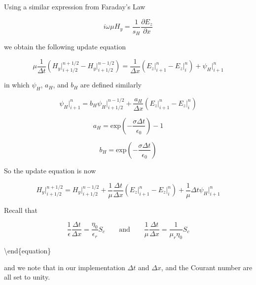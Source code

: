 \documentclass{article}
\begin{document}
    Using a similar expression from Faraday's Law

\begin{equation}
i \omega \mu H_y = \dfrac{1}{s_H} \dfrac{\partial E_z}{\partial x}
\end{equation}

we obtain the following update equation

\begin{equation}
\mu \dfrac{1}{\Delta t} \left ( H_y \Big |^{n+1/2}_{i+1/2} - H_y \Big |^{n-1/2}_{i+1/2} \right ) = \dfrac{1}{\Delta x} \left ( E_z \Big |^{n}_{i+1} - E_z \Big |^{n}_{i} \right ) + \psi_H \Big |^{n}_{i+1}
\end{equation}

in which \(\psi_H\), \(a_H\), and \(b_H\) are defined similarly

\begin{equation}
\psi_H \Big |^{n}_{i+1} = b_H \psi_H \Big |^{n-1/2}_{i+1/2} + \dfrac{a_H}{\Delta x} \left ( E_z \Big |^{n}_{i+1} - E_z \Big |^{n}_{i} \right )
\end{equation}

\begin{equation}
a_H = \mathrm{exp}\left ( - \dfrac{\sigma \Delta t}{\epsilon_0} \right ) -1 
\end{equation}

\begin{equation}
b_H = \mathrm{exp}\left ( - \dfrac{\sigma \Delta t}{\epsilon_0} \right )
\end{equation}

So the update equation is now

\begin{equation}
H_y \Big |^{n+1/2}_{i+1/2} =  H_y \Big |^{n-1/2}_{i+1/2} + \dfrac{1}{\mu} \dfrac{\Delta t}{\Delta x} \left ( E_z \Big |^{n}_{i+1} - E_z \Big |^{n}_{i} \right ) + \dfrac{1}{\mu} \Delta t \psi_H \Big |^{n}_{i+1}
\end{equation}

    Recall that

\begin{equation}
\dfrac{1}{\epsilon} \dfrac{\Delta t}{\Delta x} = \dfrac{\eta_0}{\epsilon_r} S_c \qquad \mathrm{and} \qquad 
\dfrac{1}{\mu} \dfrac{\Delta t}{\Delta x} = \dfrac{1}{\mu_r \eta_0} S_c
\end{equation}

\textbackslash{}end\{equation\}

and we note that in our implementation \(\Delta t\) and \(\Delta x\),
and the Courant number are all set to unity.
\end{document}
